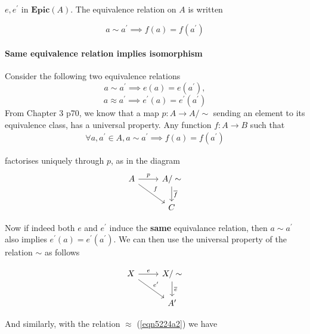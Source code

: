\documentclass{article}
\begin{document}
$e, e^\prime$ in $\mathbf{Epic}(A)$. The equivalence relation on $A$ is written

\begin{equation*}
a \sim a^\prime \implies f(a) = f(a^\prime)
\end{equation*}

\paragraph{Same equivalence relation implies isomorphism}

Consider the following two equivalence relations
\begin{equation}
  \label{eqn5224a1}
  a \sim a^\prime \implies e(a) = e(a^\prime),
\end{equation}
\begin{equation}
  \label{eqn5224a2}
  a \approx a^\prime  \implies e^\prime(a) = e^\prime(a^\prime)
\end{equation}
From Chapter 3 p70, we know that a map $p: A \rightarrow A/\sim$ sending an element to its equivalence class, has a universal property. Any function $f: A \rightarrow B$ such that
\begin{align*}
  \forall a, a^\prime \in A, a \sim a^\prime \implies f(a)=f(a^\prime)
\end{align*}

factorises uniquely through $p$, as in the diagram
\begin{equation*}
\begin{tikzcd}
A \arrow[rd,"f"] \arrow[r, "p"] & A/\sim \arrow[d, "\overline{f}"] \\
& C
\end{tikzcd}
\end{equation*}

Now if indeed both $e$ and $e^\prime$ induce the \textbf{same} equivalance relation, then $a \sim a^\prime$ also implies $e^\prime(a) = e^\prime(a^\prime)$. We can then use the universal property of the relation $\sim$ as follows

\begin{equation*}
\begin{tikzcd}
X \arrow[rd,"e^\prime"] \arrow[r, "e"] & X/\sim \arrow[d, "\overline{e}"] \\
& A^\prime
\end{tikzcd}
\end{equation*}

And similarly, with the relation $\approx$ (\ref{eqn5224a2}) we have
\end{document}
